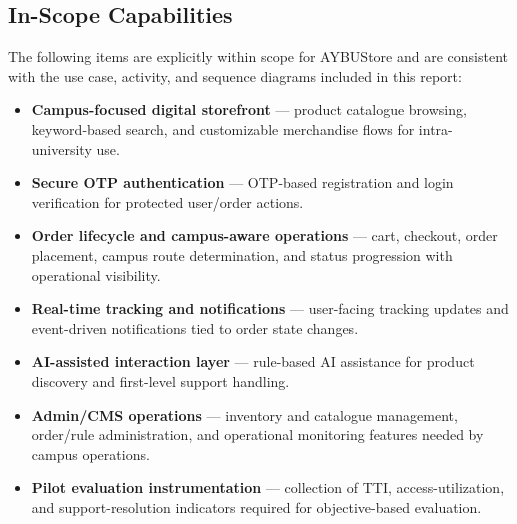 \documentclass[11pt,a4paper]{article}
\begin{document}
\subsection{In-Scope Capabilities}
The following items are explicitly within scope for AYBUStore and are
consistent with the use case, activity, and sequence diagrams included
in this report:
\begin{itemize}[leftmargin=*]
    \item \textbf{Campus-focused digital storefront} --- product
    catalogue browsing, keyword-based search, and customizable
    merchandise flows for intra-university use.
    \item \textbf{Secure OTP authentication} --- OTP-based registration
    and login verification for protected user/order actions.
    \item \textbf{Order lifecycle and campus-aware operations} ---
    cart, checkout, order placement, campus route determination, and
    status progression with operational visibility.
    \item \textbf{Real-time tracking and notifications} --- user-facing
    tracking updates and event-driven notifications tied to order state
    changes.
    \item \textbf{AI-assisted interaction layer} --- rule-based AI
    assistance for product discovery and first-level support handling.
    \item \textbf{Admin/CMS operations} --- inventory and catalogue
    management, order/rule administration, and operational monitoring
    features needed by campus operations.
    \item \textbf{Pilot evaluation instrumentation} --- collection of
    TTI, access-utilization, and support-resolution indicators required
    for objective-based evaluation.
\end{itemize}
 
\end{document}
